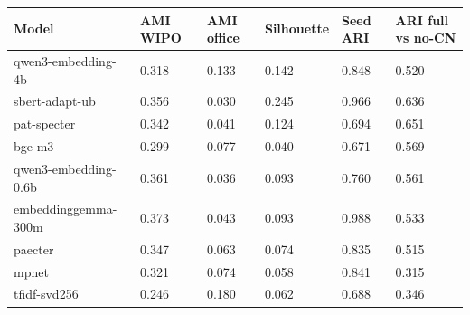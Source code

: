 \begin{tabular}{llllll}
\toprule
Model & AMI WIPO & AMI office & Silhouette & Seed ARI & ARI full vs no-CN \\
\midrule
qwen3-embedding-4b & 0.318 & 0.133 & 0.142 & 0.848 & 0.520 \\
sbert-adapt-ub & 0.356 & 0.030 & 0.245 & 0.966 & 0.636 \\
pat-specter & 0.342 & 0.041 & 0.124 & 0.694 & 0.651 \\
bge-m3 & 0.299 & 0.077 & 0.040 & 0.671 & 0.569 \\
qwen3-embedding-0.6b & 0.361 & 0.036 & 0.093 & 0.760 & 0.561 \\
embeddinggemma-300m & 0.373 & 0.043 & 0.093 & 0.988 & 0.533 \\
paecter & 0.347 & 0.063 & 0.074 & 0.835 & 0.515 \\
mpnet & 0.321 & 0.074 & 0.058 & 0.841 & 0.315 \\
tfidf-svd256 & 0.246 & 0.180 & 0.062 & 0.688 & 0.346 \\
\bottomrule
\end{tabular}
